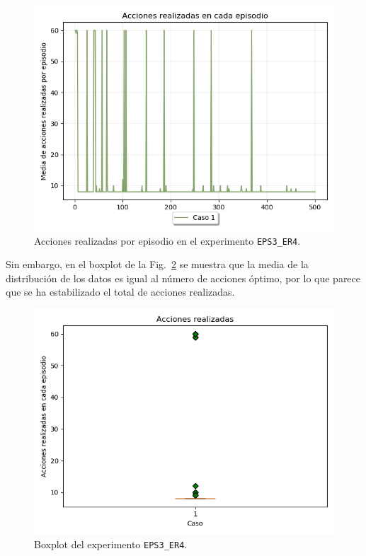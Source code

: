 \begin{figure}
    \centering
    \includegraphics[scale=0.4]{cap5_experimentacion/images/dim5_lr0.01_ep0.3_acciones.png}
    \caption{Acciones realizadas por episodio en el experimento \texttt{EPS3\_ER4}.}
    \label{fig:dim5_lr0.01_ep0.3_acciones}
\end{figure}

Sin embargo, en el boxplot de la Fig.~\ref{fig:dim5_lr0.01_ep0.3_boxplot} se muestra que la media de la distribución de los datos es igual al número de acciones óptimo, por lo que parece que se ha estabilizado el total de acciones realizadas. \\

\begin{figure}
    \centering
    \includegraphics[scale=0.4]{cap5_experimentacion/images/dim5_lr0.01_ep0.3_boxplot.png}
    \caption{Boxplot del experimento \texttt{EPS3\_ER4}.}
    \label{fig:dim5_lr0.01_ep0.3_boxplot}
\end{figure}


